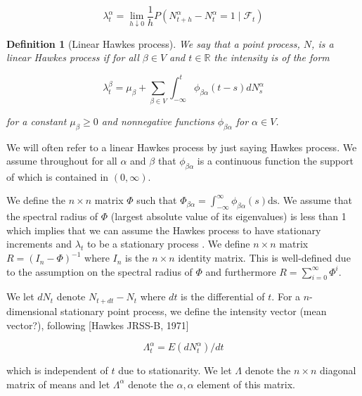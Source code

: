 \documentclass[accepted]{uai2021} %
\newtheorem{defn}[thm]{Definition}
\newcommand{\ds}{\text{ds}}
\begin{document}
$$
\lambda_t^{\alpha} = \lim_{h \downarrow 0} \dfrac{1}{h} P(N_{t + h}^\alpha  - 
N_t^\alpha = 1
\mid \mathcal{F}_t)
$$

\begin{defn}[Linear Hawkes process]
	We say that a point process, $N$, is a \emph{linear Hawkes process} if for 
	all $\beta\in V$ and $t\in \mathbb{R}$ the 
	intensity is of the form
	
	$$
	\lambda_t^\beta = \mu_\beta + \sum_{\beta \in V} \int_{-\infty}^{t} 
	\phi_{\beta\alpha}(t - s) d 
	N_s^\alpha
	$$
	
	\noindent for a constant $\mu_\beta \geq 0$ and nonnegative functions 
	$\phi_{\beta\alpha}$ for $\alpha \in V$.
	\label{def:hawProc}
\end{defn}

We will often refer to a linear Hawkes process by just saying Hawkes process. 
We assume throughout for all 
$\alpha$ and $\beta$ that $\phi_{\beta\alpha}$ is a continuous 
function the support of which is contained in $(0, \infty)$. 

We define the $n\times n$ matrix $\Phi$ such that $\Phi_{\beta\alpha} = 
\int_{-\infty}^\infty 
\phi_{\beta\alpha}(s) \ds$. We assume that the spectral radius of $\Phi$ 
(largest 
absolute value of its eigenvalues) is less than 1 which implies that we can 
assume the Hawkes process to have stationary increments and $\lambda_t$ to be a 
stationary process \citep{jovanovic2015, bacry2016}.
We define $n\times n$ matrix $R=(I_n - \Phi)^{-1}$ where $I_n$ is the 
$n\times n$ identity matrix. This is well-defined due to the assumption on 
the spectral radius of $\Phi$ and furthermore $R = \sum_{i=0}^\infty \Phi^i$. 


We let $dN_t$ denote $N_{t+dt} - N_t$ where $dt$ is the differential of $t$. 
For a $n$-dimensional stationary point process, we define the intensity vector 
(mean vector?), following [Hawkes JRSS-B, 1971]

$$
\Lambda_t^\alpha = E(dN_t^\alpha)/dt
$$

\noindent which is independent of $t$ due to stationarity. We let $\Lambda$ 
denote the $n\times n$ diagonal matrix of means and let $\Lambda^\alpha$ denote 
the $\alpha,\alpha$ element of this matrix.
\end{document}
